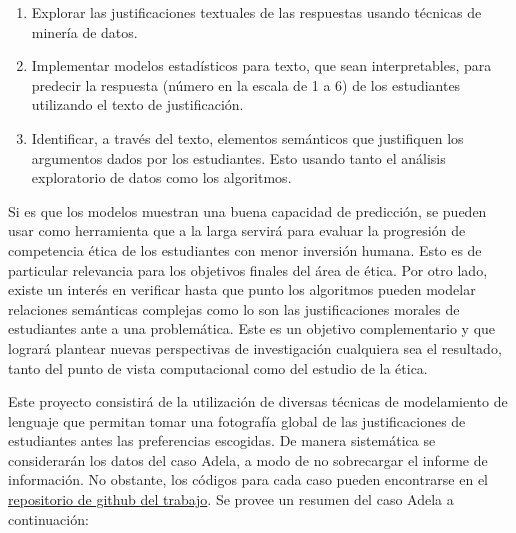 \documentclass[
	spanish, %
	letterpaper, oneside
]{article}
\begin{document}
\begin{enumerate}
    \item Explorar las justificaciones textuales de las respuestas usando técnicas de minería de datos.

    \item Implementar modelos estadísticos para texto, que sean interpretables, para predecir la respuesta (número en la escala de 1 a 6) de los estudiantes utilizando el texto de justificación.

    
    \item Identificar, a través del texto, elementos semánticos que justifiquen los argumentos dados por los estudiantes. Esto usando tanto el análisis exploratorio de datos como los algoritmos.
\end{enumerate}


\newp Si es que los modelos muestran una buena capacidad de predicción, se pueden usar como herramienta que a la larga servirá para evaluar la progresión de competencia ética de los estudiantes con menor inversión humana. Esto es de particular relevancia para los objetivos finales del área de ética. Por otro lado, existe un interés en verificar hasta que punto los algoritmos pueden modelar relaciones semánticas complejas como lo son las justificaciones morales de estudiantes ante a una problemática. Este es un objetivo complementario y que logrará plantear nuevas perspectivas de investigación cualquiera sea el resultado, tanto del punto de vista computacional como del estudio de la ética.

\newp Este proyecto consistirá de la utilización de diversas técnicas de modelamiento de lenguaje que permitan tomar una fotografía global de las justificaciones de estudiantes antes las preferencias escogidas.
De manera sistemática se considerarán los datos del caso Adela, a modo de no sobrecargar el informe de información. No obstante, los códigos para cada caso pueden encontrarse en el \href{https://github.com/camilocarvajalreyes/ethics-nlp}{repositorio de github del trabajo}. Se provee un resumen del caso Adela a continuación:
\end{document}
